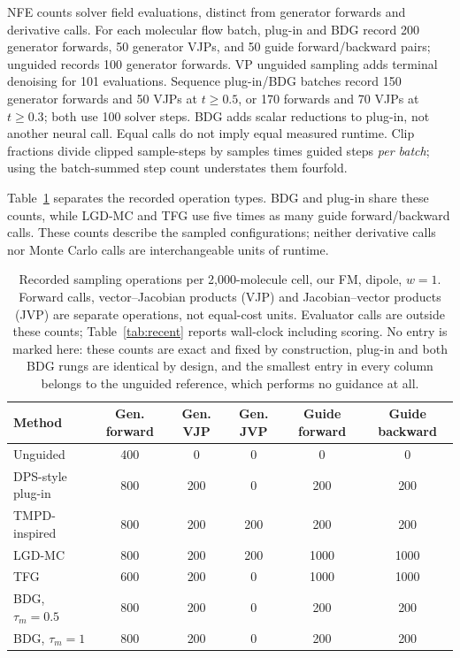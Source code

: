 \documentclass{article}
\begin{document}
NFE counts solver field evaluations, distinct from generator forwards and derivative calls. For each molecular flow batch, plug-in and BDG record 200 generator forwards, 50 generator VJPs, and 50 guide forward/backward pairs; unguided records 100 generator forwards. VP unguided sampling adds terminal denoising for 101 evaluations. Sequence plug-in/BDG batches record 150 generator forwards and 50 VJPs at $t\ge0.5$, or 170 forwards and 70 VJPs at $t\ge0.3$; both use 100 solver steps. BDG adds scalar reductions to plug-in, not another neural call. Equal calls do not imply equal measured runtime. Clip fractions divide clipped sample-steps by samples times guided steps \emph{per batch}; using the batch-summed step count understates them fourfold.

Table~\ref{tab:cost} separates the recorded operation types. BDG and plug-in share these counts, while LGD-MC and TFG use five times as many guide forward/backward calls. These counts describe the sampled configurations; neither derivative calls nor Monte Carlo calls are interchangeable units of runtime.
\begin{table}[!htbp]
\centering\small
\caption{Recorded sampling operations per 2,000-molecule cell, our FM, dipole, $w=1$. Forward calls, vector--Jacobian products (VJP) and Jacobian--vector products (JVP) are separate operations, not equal-cost units. Evaluator calls are outside these counts; Table~\ref{tab:recent} reports wall-clock including scoring. No entry is marked here: these counts are exact and fixed by construction, plug-in and both BDG rungs are identical by design, and the smallest entry in every column belongs to the unguided reference, which performs no guidance at all.}
\label{tab:cost}
\begin{tabular}{lccccc}
\toprule
Method & Gen. forward & Gen. VJP & Gen. JVP & Guide forward & Guide backward\\
\midrule
Unguided & 400 & 0 & 0 & 0 & 0\\
DPS-style plug-in & 800 & 200 & 0 & 200 & 200\\
TMPD-inspired & 800 & 200 & 200 & 200 & 200\\
LGD-MC & 800 & 200 & 200 & 1000 & 1000\\
TFG & 600 & 200 & 0 & 1000 & 1000\\
BDG, $\tau_m=0.5$ & 800 & 200 & 0 & 200 & 200\\
BDG, $\tau_m=1$ & 800 & 200 & 0 & 200 & 200\\
\bottomrule
\end{tabular}
\end{table}
\end{document}
